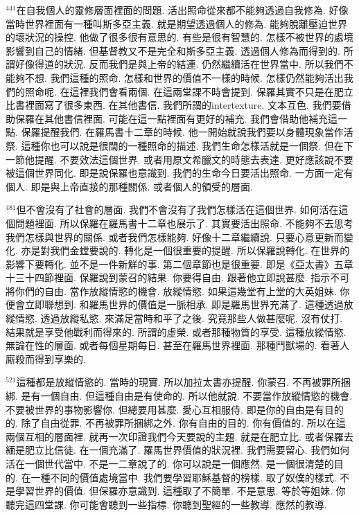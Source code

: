 \documentclass{book}
\begin{document}
$^{441}$在自我個人的靈修層面裡面的問題.
活出照命從來都不能夠透過自我修為.
好像當時世界裡面有一種叫斯多亞主義.
就是期望透過個人的修為.
能夠脫離壓迫世界的壞狀況的操控.
他做了很多很有意思的.
有些是很有智慧的.
怎樣不被世界的處境影響到自己的情緒.
但基督教又不是完全和斯多亞主義.
透過個人修為而得到的.
所謂好像得道的狀況.
反而我們是與上帝的結連.
仍然繼續活在世界當中.
所以我們不能夠不想.
我們這種的照命.
怎樣和世界的價值不一樣的時候.
怎樣仍然能夠活出我們的照命呢.
在這裡我們會看兩個.
在這兩堂課不時會提到.
保羅其實不只是在肥立比書裡面寫了很多東西.
在其他書信.
我們所謂的intertexture.
文本互色.
我們要借助保羅在其他書信裡面.
可能在這一點裡面有更好的補充.
我們會借助他補充這一點.
保羅提醒我們.
在羅馬書十二章的時候.
他一開始就說我們要以身體現象當作活祭.
這種你也可以說是很闊的一種照命的描述.
我們生命怎樣活就是一個祭.
但在下一節他提醒.
不要效法這個世界.
或者用原文希臘文的時態去表達.
更好應該說不要被這個世界同化.
即是說保羅也意識到.
我們的生命今日要活出照命.
一方面一定有個人.
即是與上帝直接的那種關係.
或者個人的領受的層面.

$^{481}$但不會沒有了社會的層面.
我們不會沒有了我們怎樣活在這個世界.
如何活在這個問題裡面.
所以保羅在羅馬書十二章也展示了.
其實要活出照命.
不能夠不去思考我們怎樣與世界的關係.
或者我們怎樣能夠.
好像十二章繼續說.
只要心意更新而變化.
亦是對我們金螳要說的.
轉化是一個很重要的提醒.
所以保羅說轉化.
在世界的影響下要轉化.
並不是一件新鮮的事.
第二個章節也是很重要.
即是《亞太書》五章十三十四節裡面.
保羅說到蒙召的結果.
你要得自由.
跟著他立即說甚麼.
指示不可將你們的自由.
當作放縱情慾的機會.
放縱情慾.
如果這幾堂有上堂的大英姐妹.
你便會立即聯想到.
和羅馬世界的價值是一脈相承.
即是羅馬世界充滿了.
這種透過放縱情慾.
透過放縱私慾.
來滿足當時和平了之後.
究竟那些人做甚麼呢.
沒有仗打.
結果就是享受他戰利而得來的.
所謂的虛榮.
或者那種物質的享受.
這種放縱情慾.
無論在性的層面.
或者每個星期每日.
甚至在羅馬世界裡面.
那種鬥獸場的.
看著人廝殺而得到享樂的.

$^{521}$這種都是放縱情慾的.
當時的現實.
所以加拉太書亦提醒.
你蒙召.
不再被罪所捆綁.
是有一個自由.
但這種自由是有使命的.
所以他就說.
不要當作放縱情慾的機會.
不要被世界的事物影響你.
但總要用甚麼.
愛心互相服侍.
即是你的自由是有目的的.
除了自由從罪.
不再被罪所捆綁之外.
你有自由的目的.
你有價值的.
所以在這兩個互相的層面裡.
就再一次印證我們今天要說的主題.
就是在肥立比.
或者保羅去緬是肥立比信徒.
在一個充滿了.
羅馬世界價值的狀況裡.
我們需要留心.
我們如何活在一個世代當中.
不是一二章說了的.
你可以說是一個應然.
是一個很清楚的目的.
在一種不同的價值處境當中.
我們要學習耶穌基督的榜樣.
取了奴僕的樣式.
不是學習世界的價值.
但保羅亦意識到.
這種取了不簡單.
不是意思.
等於等姐妹.
你聽完這四堂課.
你可能會聽到一些指標.
你聽到聖經的一些教導.
應然的教導.
\end{document}
